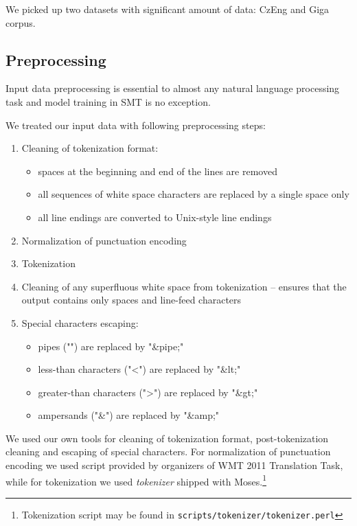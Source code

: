 We picked up two datasets with significant amount of data: CzEng and Giga corpus.

\subsection{Preprocessing}

Input data preprocessing is essential to almost any natural language processing task
and model training in SMT is no exception.

We treated our input data with following preprocessing steps:
\begin{enumerate}
  \item Cleaning of tokenization format:
  \begin{itemize}
    \item spaces at the beginning and end of the lines are removed
    \item all sequences of white space characters are replaced by a single space only
    \item all line endings are converted to Unix-style line endings
  \end{itemize}
  \item Normalization of punctuation encoding
  \item Tokenization
  \item Cleaning of any superfluous white space from tokenization -- ensures that the output contains only spaces and line-feed characters
  \item Special characters escaping:
  \begin{itemize}
    \item pipes ("\textbar") are replaced by "\&pipe;"
    \item less-than characters ("<") are replaced by "\&lt;"
    \item greater-than characters (">") are replaced by "\&gt;"
    \item ampersands ("\&") are replaced by "\&amp;"
  \end{itemize}
\end{enumerate}

We used our own tools for cleaning of tokenization format,
post-tokenization cleaning and escaping of special characters.
For normalization of punctuation encoding we used script provided by organizers of
WMT 2011 Translation Task,
while for tokenization we used \emph{tokenizer} shipped with
Moses.\footnote{Tokenization script may be found in \texttt{scripts/tokenizer/tokenizer.perl}}


